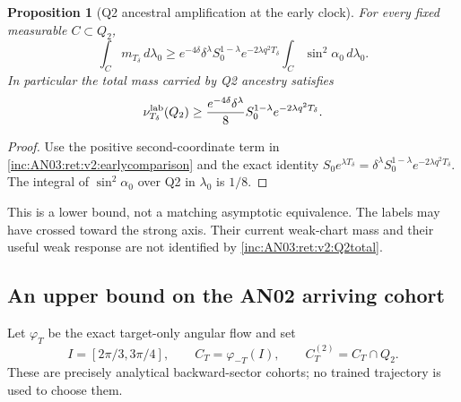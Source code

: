 \documentclass[11pt]{article}
\numberwithin{equation}{section}
\newtheorem{proposition}[theorem]{Proposition}
\theoremstyle{remark}\newtheorem{remark}[theorem]{Remark}
\newcommand{\dd}{\,d}
\newcommand{\1}{\mathbf 1}
\begin{document}
\begin{proposition}[Q2 ancestral amplification at the early clock]
\label{inc:AN03:ret:v2:Q2mass}
For every fixed measurable $C\subset Q_2$,
\begin{equation}\label{inc:AN03:ret:v2:Q2weighted}
 \int_Cm_{T_\delta}\dd\lambda_0
 \ge e^{-4\delta}\delta^\lambda S_0^{1-\lambda}
 e^{-2\lambda q^2T_\delta}
 \int_C\sin^2\alpha_0\dd\lambda_0.
\end{equation}
In particular the total mass carried by Q2 ancestry satisfies
\begin{equation}\label{inc:AN03:ret:v2:Q2total}
 \nu^{\rm lab}_{T_\delta}(Q_2)
 \ge \frac{e^{-4\delta}\delta^\lambda}{8}
 S_0^{1-\lambda}e^{-2\lambda q^2T_\delta}.
\end{equation}
\end{proposition}
\begin{proof}
Use the positive second-coordinate term in
\eqref{inc:AN03:ret:v2:earlycomparison} and the exact identity
$S_0e^{\lambda T_\delta}
=\delta^\lambda S_0^{1-\lambda}e^{-2\lambda q^2T_\delta}$.
The integral of $\sin^2\alpha_0$ over Q2 in $\lambda_0$ is $1/8$.
\end{proof}
This is a lower bound, not a matching asymptotic equivalence. The labels
may have crossed toward the strong axis. Their current weak-chart mass
and their useful weak response are not identified by
\eqref{inc:AN03:ret:v2:Q2total}.

\subsection{An upper bound on the AN02 arriving cohort}
Let $\varphi_T$ be the exact target-only angular flow and set
\[
 I=[2\pi/3,3\pi/4],\qquad C_T=\varphi_{-T}(I),\qquad
 C_T^{(2)}=C_T\cap Q_2.
\]
These are precisely analytical backward-sector cohorts; no trained
trajectory is used to choose them.
\end{document}
